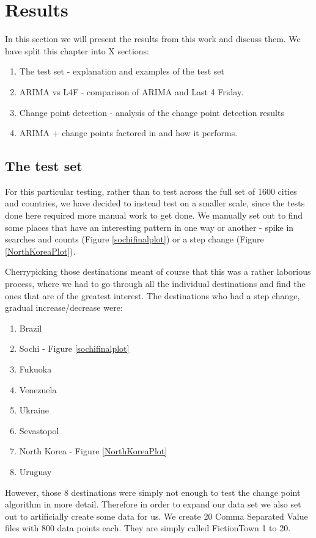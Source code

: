\documentclass[minf,twoside,singlespacing,parskip,frontabs,notimes,12pt]{infthesis} %
\begin{document}
\chapter{Results}

In this section we will present the results from this work and discuss them. We have split this chapter into X sections:
\begin{enumerate}
\item The test set - explanation and examples of the test set
\item ARIMA vs L4F - comparison of ARIMA and Last 4 Friday. 
\item Change point detection - analysis of the change point detection results
\item ARIMA + change points factored in and how it performs.
\end{enumerate}

\section{The test set}

For this particular testing, rather than to test across the full set of 1600 cities and countries, we have decided to instead test on a smaller scale, since the tests done here required more manual work to get done. We manually set out to find some places that have an interesting pattern in one way or another - spike in searches and counts (Figure \ref{sochifinalplot}) or a step change (Figure \ref{NorthKoreaPlot}).


Cherrypicking those destinations meant of course that this was a rather laborious process, where we had to go through all the individual destinations and find the ones that are of the greatest interest. 
The destinations who had a step change, gradual increase/decrease were:

\begin{enumerate}
\item Brazil
\item Sochi - Figure \ref{sochifinalplot}
\item Fukuoka
\item Venezuela
\item Ukraine
\item Sevastopol
\item North Korea - Figure \ref{NorthKoreaPlot}
\item Uruguay
\end{enumerate}

However, those 8 destinations were simply not enough to test the change point algorithm in more detail. Therefore in order to expand our data set we also set out to artificially create some data for us. We create 20 Comma Separated Value files with 800 data points each. They are simply called FictionTown 1 to 20. 
\end{document}
